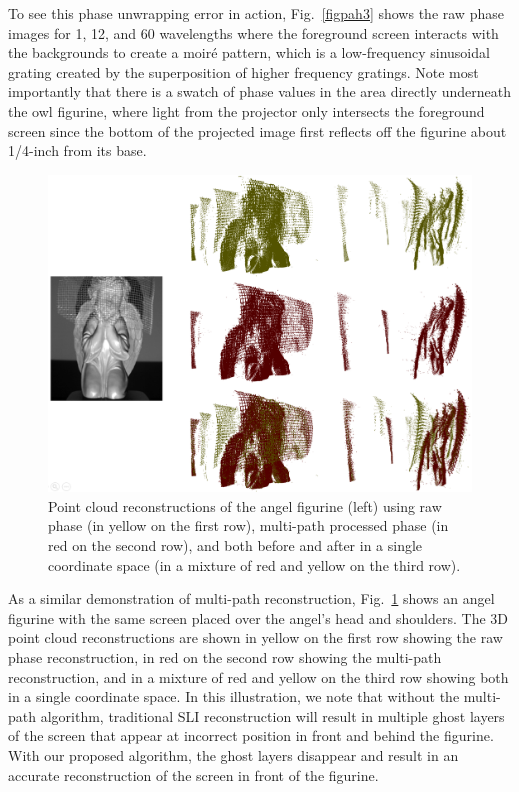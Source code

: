 \documentclass[10pt]{article}
\begin{document}
To see this phase unwrapping error in action, Fig.~\ref{figpah3} shows the raw phase images for 1, 12, and 60 wavelengths where the foreground screen interacts with the backgrounds to create a moir\'e pattern, which is a low-frequency sinusoidal grating created by the superposition of higher frequency gratings.  Note most importantly that there is a swatch of phase values in the area directly underneath the owl figurine, where light from the projector only intersects the foreground screen since the bottom of the projected image first reflects off the figurine about 1/4-inch from its base.

\begin{figure}[h]
	\centering\includegraphics[width=4.8in]{Figures/angel1}
	\caption{Point cloud reconstructions of the angel figurine (left) using raw phase (in yellow on the first row), multi-path processed phase (in red on the second row), and both before and after in a single coordinate space (in a mixture of red and yellow on the third row).}
	\label{angel}
\end{figure}

As a similar demonstration of multi-path reconstruction, Fig.~\ref{angel} shows an angel figurine with the same screen placed over the angel's head and shoulders. The 3D point cloud reconstructions are shown in yellow on the first row showing the raw phase reconstruction, in red on the second row showing the multi-path reconstruction, and in a mixture of red and yellow on the third row showing both in a single coordinate space. In this illustration, we note that without the multi-path algorithm, traditional SLI reconstruction will result in multiple ghost layers of the screen that appear at incorrect position in front and behind the figurine. With our proposed algorithm, the ghost layers disappear and result in an accurate reconstruction of the screen in front of the figurine.
\end{document}
